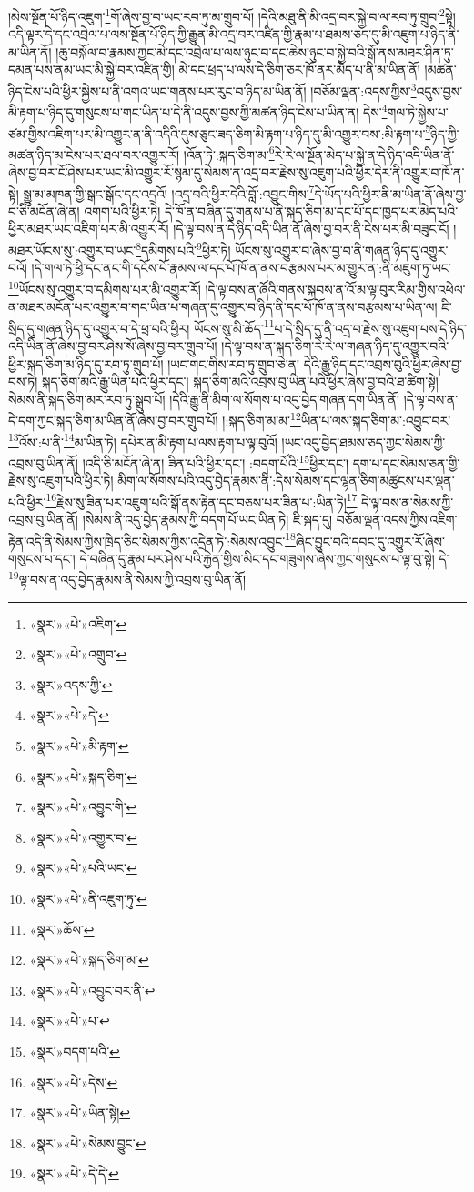 །མེས་སྔོན་པོ་ཉིད་འཇུག་\footnote{«སྣར་»«པེ་»འཇིག་}གོ་ཞེས་བྱ་བ་ཡང་རབ་ཏུ་མ་གྲུབ་པོ། །དེའི་མཐུ་ནི་མི་འདྲ་བར་སྐྱེ་བ་ལ་རབ་ཏུ་གྲུབ་\footnote{«སྣར་»«པེ་»འགྲུབ་}སྟེ། འདི་ལྟར་དེ་དང་འབྲེལ་པ་ལས་སྔོན་པོ་ཉིད་ཀྱི་རྒྱུན་མི་འདྲ་བར་འཛིན་གྱི་རྣམ་པ་ཐམས་ཅད་དུ་མི་འཇུག་པ་ཉིད་ནི་མ་ཡིན་ནོ། །ཆུ་བསྐོལ་བ་རྣམས་ཀྱང་མེ་དང་འབྲེལ་པ་ལས་ཉུང་བ་དང་ཆེས་ཉུང་བ་སྐྱེ་བའི་སྒོ་ནས་མཐར་ཤིན་ཏུ་དམན་པས་ནམ་ཡང་མི་སྐྱེ་བར་འཛིན་གྱི། མེ་དང་ཕྲད་པ་ལས་དེ་ཅིག་ཅར་ཁོ་ནར་མེད་པ་ནི་མ་ཡིན་ནོ། །མཚན་ཉིད་ངེས་པའི་ཕྱིར་སྐྱེས་པ་ནི་འགའ་ཡང་གནས་པར་རུང་བ་ཉིད་མ་ཡིན་ནོ། །བཅོམ་ལྡན་:འདས་ཀྱིས་\footnote{«སྣར་»འདས་ཀྱི་}འདུས་བྱས་མི་རྟག་པ་ཉིད་དུ་གསུངས་པ་གང་ཡིན་པ་དེ་ནི་འདུས་བྱས་ཀྱི་མཚན་ཉིད་ངེས་པ་ཡིན་ན། དེས་\footnote{«སྣར་»«པེ་»དེ་}གལ་ཏེ་སྐྱེས་པ་ཙམ་གྱིས་འཇིག་པར་མི་འགྱུར་ན་ནི་འདིའི་དུས་ཅུང་ཟད་ཅིག་མི་རྟག་པ་ཉིད་དུ་མི་འགྱུར་བས་:མི་རྟག་པ་\footnote{«སྣར་»«པེ་»མི་རྟག་}ཉིད་ཀྱི་མཚན་ཉིད་མ་ངེས་པར་ཐལ་བར་འགྱུར་རོ། །འོན་ཏེ་:སྐད་ཅིག་མ་\footnote{«སྣར་»«པེ་»སྐད་ཅིག་}རེ་རེ་ལ་སྔོན་མེད་པ་སྐྱེ་ན་དེ་ཉིད་འདི་ཡིན་ནོ་ཞེས་བྱ་བར་ངོ་ཤེས་པར་ཡང་མི་འགྱུར་རོ་སྙམ་དུ་སེམས་ན་འདྲ་བར་རྗེས་སུ་འཇུག་པའི་ཕྱིར་དེར་ནི་འགྱུར་བ་ཁོ་ན་སྟེ། སྒྱུ་མ་མཁན་གྱི་སྒང་སྒོང་དང་འདྲའོ། །འདྲ་བའི་ཕྱིར་དེའི་བློ་:འབྱུང་གིས་\footnote{«སྣར་»«པེ་»འབྱུང་གི་}དེ་ཡོད་པའི་ཕྱིར་ནི་མ་ཡིན་ནོ་ཞེས་བྱ་བ་ཅི་མངོན་ཞེ་ན། འགག་པའི་ཕྱིར་ཏེ། དེ་ཁོ་ན་བཞིན་དུ་གནས་པ་ནི་སྐད་ཅིག་མ་དང་པོ་དང་ཁྱད་པར་མེད་པའི་ཕྱིར་མཐར་ཡང་འཇིག་པར་མི་འགྱུར་རོ། །དེ་ལྟ་བས་ན་དེ་ཉིད་འདི་ཡིན་ནོ་ཞེས་བྱ་བར་ནི་ངེས་པར་མི་བཟུང་ངོ། །མཐར་ཡོངས་སུ་:འགྱུར་བ་ཡང་\footnote{«སྣར་»«པེ་»འགྱུར་བ་}དམིགས་པའི་\footnote{«སྣར་»«པེ་»པའི་ཡང་}ཕྱིར་ཏེ། ཡོངས་སུ་འགྱུར་བ་ཞེས་བྱ་བ་ནི་གཞན་ཉིད་དུ་འགྱུར་བའོ། །དེ་གལ་ཏེ་ཕྱི་དང་ནང་གི་དངོས་པོ་རྣམས་ལ་དང་པོ་ཁོ་ན་ནས་བརྩམས་པར་མ་གྱུར་ན་:ནི་མཇུག་ཏུ་ཡང་\footnote{«སྣར་»«པེ་»ནི་འཇུག་ཏུ་}ཡོངས་སུ་འགྱུར་བ་དམིགས་པར་མི་འགྱུར་རོ། །དེ་ལྟ་བས་ན་ཞོའི་གནས་སྐབས་ན་འོ་མ་ལྟ་བུར་རིམ་གྱིས་འཕེལ་ན་མཐར་མངོན་པར་འགྱུར་བ་གང་ཡིན་པ་གཞན་དུ་འགྱུར་བ་ཉིད་ནི་དང་པོ་ཁོ་ན་ནས་བརྩམས་པ་ཡིན་ལ། ཇི་སྲིད་དུ་གཞན་ཉིད་དུ་འགྱུར་བ་དེ་ཕྲ་བའི་ཕྱིར། ཡོངས་སུ་མི་ཆོད་\footnote{«སྣར་»ཆོས་}པ་དེ་སྲིད་དུ་ནི་འདྲ་བ་རྗེས་སུ་འཇུག་པས་དེ་ཉིད་འདི་ཡིན་ནོ་ཞེས་བྱ་བར་ཤེས་སོ་ཞེས་བྱ་བར་གྲུབ་པོ། །དེ་ལྟ་བས་ན་སྐད་ཅིག་རེ་རེ་ལ་གཞན་ཉིད་དུ་འགྱུར་བའི་ཕྱིར་སྐད་ཅིག་མ་ཉིད་དུ་རབ་ཏུ་གྲུབ་པོ། །ཡང་གང་གིས་རབ་ཏུ་གྲུབ་ཅེ་ན། དེའི་རྒྱུ་ཉིད་དང་འབྲས་བུའི་ཕྱིར་ཞེས་བྱ་བས་ཏེ། སྐད་ཅིག་མའི་རྒྱུ་ཡིན་པའི་ཕྱིར་དང་། སྐད་ཅིག་མའི་འབྲས་བུ་ཡིན་པའི་ཕྱིར་ཞེས་བྱ་བའི་ཐ་ཚིག་སྟེ། སེམས་ནི་སྐད་ཅིག་མར་རབ་ཏུ་སྒྲུབ་པོ། །དེའི་རྒྱུ་ནི་མིག་ལ་སོགས་པ་འདུ་བྱེད་གཞན་དག་ཡིན་ནོ། །དེ་ལྟ་བས་ན་དེ་དག་ཀྱང་སྐད་ཅིག་མ་ཡིན་ནོ་ཞེས་བྱ་བར་གྲུབ་པོ། །:སྐད་ཅིག་མ་མ་\footnote{«སྣར་»«པེ་»སྐད་ཅིག་མ་}ཡིན་པ་ལས་སྐད་ཅིག་མ་:འབྱུང་བར་\footnote{«སྣར་»«པེ་»འབྱུང་བར་ནི་}འོས་:པ་ནི་\footnote{«སྣར་»«པེ་»པ་}མ་ཡིན་ཏེ། དཔེར་ན་མི་རྟག་པ་ལས་རྟག་པ་ལྟ་བུའོ། །ཡང་འདུ་བྱེད་ཐམས་ཅད་ཀྱང་སེམས་ཀྱི་འབྲས་བུ་ཡིན་ནོ། །འདི་ཅི་མངོན་ཞེ་ན། ཟིན་པའི་ཕྱིར་དང་། :བདག་པོའི་\footnote{«སྣར་»བདག་པའི་}ཕྱིར་དང་། དག་པ་དང་སེམས་ཅན་གྱི་རྗེས་སུ་འཇུག་པའི་ཕྱིར་ཏེ། མིག་ལ་སོགས་པའི་འདུ་བྱེད་རྣམས་ནི་:དེས་སེམས་དང་ལྷན་ཅིག་མཚུངས་པར་ལྡན་པའི་ཕྱིར་\footnote{«སྣར་»«པེ་»དེས་}རྗེས་སུ་ཟིན་པར་འཇུག་པའི་སྒོ་ནས་རྟེན་དང་བཅས་པར་ཟིན་པ་:ཡིན་ཏེ།\footnote{«སྣར་»«པེ་»ཡིན་སྟེ།} དེ་ལྟ་བས་ན་སེམས་ཀྱི་འབྲས་བུ་ཡིན་ནོ། །སེམས་ནི་འདུ་བྱེད་རྣམས་ཀྱི་བདག་པོ་ཡང་ཡིན་ཏེ། ཇི་སྐད་དུ། བཅོམ་ལྡན་འདས་ཀྱིས་འཇིག་རྟེན་འདི་ནི་སེམས་ཀྱིས་ཁྲིད་ཅིང་སེམས་ཀྱིས་འདྲེན་ཏེ་:སེམས་འབྱུང་\footnote{«སྣར་»«པེ་»སེམས་བྱུང་}ཞིང་བྱུང་བའི་དབང་དུ་འགྱུར་རོ་ཞེས་གསུངས་པ་དང་། དེ་བཞིན་དུ་རྣམ་པར་ཤེས་པའི་རྐྱེན་གྱིས་མིང་དང་གཟུགས་ཞེས་ཀྱང་གསུངས་པ་ལྟ་བུ་སྟེ། དེ་\footnote{«སྣར་»«པེ་»དེ་དེ་}ལྟ་བས་ན་འདུ་བྱེད་རྣམས་ནི་སེམས་ཀྱི་འབྲས་བུ་ཡིན་ནོ། 
